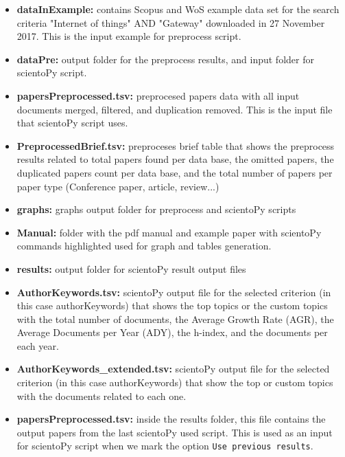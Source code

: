 \documentclass[10pt,letterpaper]{article}
\begin{document}
\begin{itemize}
	\item \textbf{dataInExample: } contains Scopus and WoS example data set for the search criteria "Internet of things" AND "Gateway" downloaded in 27 November 2017. This is the input example for preprocess script.
	
	\item \textbf{dataPre: } output folder for the preprocess results, and input folder for scientoPy script.
	
	\item \textbf{papersPreprocessed.tsv: } preprocesed papers data with all input documents merged, filtered, and duplication removed. This is the input file that scientoPy script uses.
	
	\item \textbf{PreprocessedBrief.tsv: } preproceses brief table that shows the preprocess results related to total papers found per data base, the omitted papers, the duplicated papers count per data base, and the total number of papers per paper type (Conference paper, article, review...)
	
	\item \textbf{graphs: } graphs output folder for preprocess and scientoPy scripts
	
	\item \textbf{Manual: } folder with the pdf manual and example paper with scientoPy commands highlighted used for graph and tables generation. 
	
	\item \textbf{results: } output folder for scientoPy result output files
	
	\item \textbf{AuthorKeywords.tsv: } scientoPy output file for the selected criterion (in this case authorKeywords) that shows the top topics or the custom  topics with the total number of documents, the Average Growth Rate (AGR), the Average Documents per Year (ADY), the h-index, and the documents per each year. 
	
	\item \textbf{AuthorKeywords\_extended.tsv: } scientoPy output file for the selected criterion (in this case authorKeywords) that show the top or custom topics with the documents related to each one.
	
	\item \textbf{papersPreprocessed.tsv: } inside the results folder, this file contains the output papers from the last scientoPy used script. This is used as an input for scientoPy script when we mark the option \verb|Use previous results|.
\end{itemize}
\end{document}

